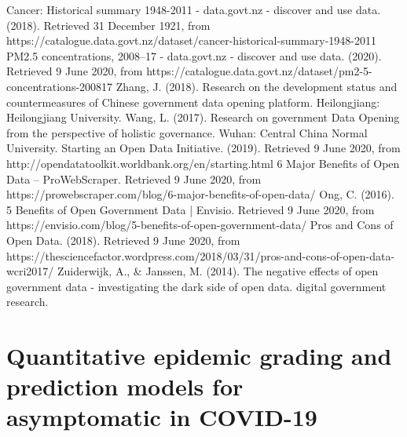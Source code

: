 \documentclass[a4paper, 11pt,twoside=true]{scrartcl}
\begin{document}
\newpage
\begin{thebibliography}{99}
	Cancer: Historical summary 1948-2011 - data.govt.nz - discover and use data. (2018). Retrieved 31 December 1921, from https://catalogue.data.govt.nz/dataset/cancer-historical-summary-1948-2011
	PM2.5 concentrations, 2008–17 - data.govt.nz - discover and use data. (2020). Retrieved 9 June 2020, from https://catalogue.data.govt.nz/dataset/pm2-5-concentrations-200817
	Zhang, J. (2018). Research on the development status and countermeasures of Chinese government data opening platform. Heilongjiang: Heilongjiang University.
	Wang, L. (2017). Research on government Data Opening from the perspective of holistic governance. Wuhan: Central China Normal University.
	Starting an Open Data Initiative. (2019). Retrieved 9 June 2020, from http://opendatatoolkit.worldbank.org/en/starting.html
	6 Major Benefits of Open Data – ProWebScraper. Retrieved 9 June 2020, from https://prowebscraper.com/blog/6-major-benefits-of-open-data/
	Ong, C. (2016). 5 Benefits of Open Government Data | Envisio. Retrieved 9 June 2020, from https://envisio.com/blog/5-benefits-of-open-government-data/
	Pros and Cons of Open Data. (2018). Retrieved 9 June 2020, from https://thesciencefactor.wordpress.com/2018/03/31/pros-and-cons-of-open-data-wcri2017/
	Zuiderwijk, A., \& Janssen, M. (2014). The negative effects of open government data - investigating the dark side of open data. digital government research.
\end{thebibliography}

\newpage
{}
\section{Quantitative epidemic grading and prediction models for asymptomatic in COVID-19}
\end{document}
